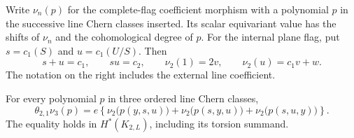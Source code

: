 Write $\nu_n(p)$ for the complete-flag coefficient morphism with
a polynomial $p$ in the successive line Chern classes inserted.
Its scalar equivariant value has the shifts of $\nu_n$ and the
cohomological degree of $p$.
For the internal plane flag, put $s=c_1(S)$ and $u=c_1(U/S)$.
Then
\begin{equation}
 s+u=c_1,\qquad su=c_2,
 \qquad \nu_2(1)=2v,\qquad \nu_2(u)=c_1v+w.
 \label{cr21:eq:plane-flag}
\end{equation}
The notation on the right includes the external line coefficient.

\begin{lemma}
\label{cr21:lem:flag}
For every polynomial $p$ in three ordered line Chern classes,
\begin{equation}
 \theta_{2,1}\nu_3(p)
 =e\left\{\nu_2\bigl(p(y,s,u)\bigr)
           +\nu_2\bigl(p(s,y,u)\bigr)
           +\nu_2\bigl(p(s,u,y)\bigr)\right\}.
 \label{cr21:eq:flag}
\end{equation}
The equality holds in $H^*(K_{2,L})$, including its torsion summand.
\end{lemma}

